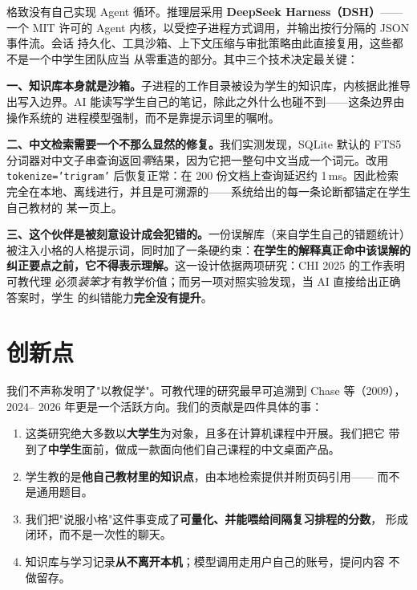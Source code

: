 \documentclass[11pt,a4paper,UTF8,fontset=windows]{ctexart}
\begin{document}
格致没有自己实现 Agent 循环。推理层采用 \textbf{DeepSeek Harness（DSH）}——一个
MIT 许可的 Agent 内核，以受控子进程方式调用，并输出按行分隔的 JSON 事件流。会话
持久化、工具沙箱、上下文压缩与审批策略由此直接复用，这些都不是一个中学生团队应当
从零重造的部分。其中三个技术决定最关键：

\textbf{一、知识库本身就是沙箱。}子进程的工作目录被设为学生的知识库，内核据此推导
出写入边界。AI 能读写学生自己的笔记，除此之外什么也碰不到——这条边界由操作系统的
进程模型强制，而不是靠提示词里的嘱咐。

\textbf{二、中文检索需要一个不那么显然的修复。}我们实测发现，SQLite 默认的 FTS5
分词器对中文子串查询返回\emph{零}结果，因为它把一整句中文当成一个词元。改用
\texttt{tokenize='trigram'} 后恢复正常：在 200 份文档上查询延迟约 1\,ms。因此检索
完全在本地、离线进行，并且是可溯源的——系统给出的每一条论断都锚定在学生自己教材的
某一页上。

\textbf{三、这个伙伴是被刻意设计成会犯错的。}一份误解库（来自学生自己的错题统计）
被注入小格的人格提示词，同时加了一条硬约束：\textbf{在学生的解释真正命中该误解的
纠正要点之前，它不得表示理解。}这一设计依据两项研究：CHI 2025 的工作表明可教代理
必须\emph{装笨}才有教学价值；而另一项对照实验发现，当 AI 直接给出正确答案时，学生
的纠错能力\textbf{完全没有提升}。

\section{创新点}

我们不声称发明了"以教促学"。可教代理的研究最早可追溯到 Chase 等（2009），2024--
2026 年更是一个活跃方向。我们的贡献是四件具体的事：

\begin{enumerate}
  \item 这类研究绝大多数以\textbf{大学生}为对象，且多在计算机课程中开展。我们把它
  带到了\textbf{中学生}面前，做成一款面向他们自己课程的中文桌面产品。
  \item 学生教的是\textbf{他自己教材里的知识点}，由本地检索提供并附页码引用——
  而不是通用题目。
  \item 我们把"说服小格"这件事变成了\textbf{可量化、并能喂给间隔复习排程的分数}，
  形成闭环，而不是一次性的聊天。
  \item 知识库与学习记录\textbf{从不离开本机}；模型调用走用户自己的账号，提问内容
  不做留存。
\end{enumerate}

\end{document}
